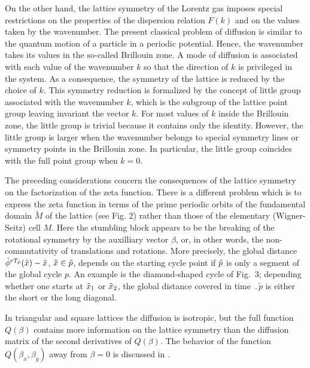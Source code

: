 On the other hand, the lattice symmetry of the Lorentz gas
imposes special restrictions on the properties of the dispersion relation
$F(k)$ and on the values taken by the wavenumber.  The present classical
problem of diffusion is similar to the quantum motion of a particle in a
periodic potential.  Hence, the wavenumber takes its values in the so-called
Brillouin zone.  A mode of diffusion is associated with each value of
the wavenumber $k$ so that the direction of $k$ is privileged in the
system.  As a consequence, the symmetry of the lattice is reduced by the choice
of $k$.  This symmetry reduction is formalized by the concept of little group
associated with the wavenumber $k$, which is the subgroup of the lattice point
group leaving invariant the vector $k$.  For most values of $k$ inside the
Brillouin zone, the little group is trivial because it contains only the
identity.  However, the little group is larger when the wavenumber belongs to
special symmetry lines or symmetry points in the Brillouin zone.  In particular,
the little group coincides with the full point group when $k=0$.

The preceding considerations concern the consequences of the lattice symmetry
on the factorization of the zeta function.  There is a different problem which
is to express the zeta function in terms of the prime periodic orbits of the
fundamental domain $\tilde M$ of the lattice (see Fig. 2) rather than
those of the elementary (Wigner-Seitz) cell $M$.
Here the stumbling block appears to be
the breaking of the rotational symmetry by
the auxilliary vector $\beta$, or, in other words,
the non-commutativity of translations and rotations.
More precisely, the global distance
$ \hat\phi^{r {T_{\tilde{p}}}} (\tilde x{}) - \tilde x{} $, $\tilde x{} \in {\tilde p}$,
depends on the starting cycle point if
${\tilde p}$ is only a segment of the global cycle $p$. An
example is the diamond-shaped cycle of Fig.~3;
depending whether one starts at $\tilde x_1$ or $\tilde x_2$, the global
distance covered in time $\period{\tilde{p}}$ is either the short or the
long diagonal.

In triangular and square lattices the diffusion is isotropic, but the
full function $Q(\beta)$ contains more information on the lattice
symmetry than the diffusion matrix of the second derivatives of
$Q(\beta)$. The behavior of the function $Q(\beta_x, \beta_y)$ away from
$\beta=0$ is discussed in . 

